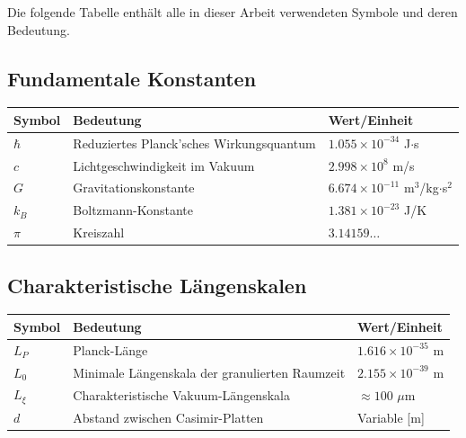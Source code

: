 	Die folgende Tabelle enthält alle in dieser Arbeit verwendeten Symbole und deren Bedeutung.
	
	\subsection{Fundamentale Konstanten}
	\begin{longtable}{>{\raggedright\arraybackslash}p{1cm} >{\raggedright\arraybackslash}p{7cm} >{\raggedright\arraybackslash}p{2.5cm}}
		\toprule
		\textbf{Symbol} & \textbf{Bedeutung} & \textbf{Wert/Einheit} \\
		\midrule
		$\hbar$ & Reduziertes Planck'sches Wirkungsquantum & $1.055 \times 10^{-34}$ J$\cdot$s \\
		$c$ & Lichtgeschwindigkeit im Vakuum & $2.998 \times 10^8$ m/s \\
		$G$ & Gravitationskonstante & $6.674 \times 10^{-11}$ m$^3$/kg$\cdot$s$^2$ \\
		$k_B$ & Boltzmann-Konstante & $1.381 \times 10^{-23}$ J/K \\
		$\pi$ & Kreiszahl & $3.14159\ldots$ \\
		\bottomrule
	\end{longtable}
	
	\subsection{Charakteristische Längenskalen}
	\begin{longtable}{>{\raggedright\arraybackslash}p{1.5cm} >{\raggedright\arraybackslash}p{6.5cm} >{\raggedright\arraybackslash}p{2.5cm}}
		\toprule
		\textbf{Symbol} & \textbf{Bedeutung} & \textbf{Wert/Einheit} \\
		\midrule
		$L_P$ & Planck-Länge & $1.616 \times 10^{-35}$ m \\
		$L_0$ & Minimale Längenskala der granulierten Raumzeit & $2.155 \times 10^{-39}$ m \\
		$L_\xi$ & Charakteristische Vakuum-Längenskala & $\approx 100$ $\mu$m \\
		$d$ & Abstand zwischen Casimir-Platten & Variable [m] \\
		\bottomrule
	\end{longtable}
	

